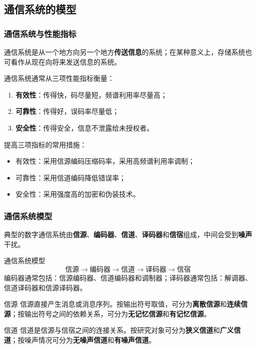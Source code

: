 \subsection{通信系统的模型}

\subsubsection{通信系统与性能指标}
通信系统是从一个地方向另一个地方\textbf{传送信息}的系统；在某种意义上，存储系统也可看作从现在向将来发送信息的系统。

通信系统通常从三项性能指标衡量：
\begin{enumerate}
  \item \textbf{有效性}：传得快，码尽量短，频谱利用率尽量高；
  \item \textbf{可靠性}：传得好，误码率尽量低；
  \item \textbf{安全性}：传得安全，信息不泄露给未授权者。
\end{enumerate}

提高三项指标的常用措施：
\begin{itemize}
  \item 有效性：采用信源编码压缩码率，采用高频谱利用率调制；
  \item 可靠性：采用信道编码降低错误率；
  \item 安全性：采用强度高的加密和伪装技术。
\end{itemize}

\subsubsection{通信系统模型}
典型的数字通信系统由\textbf{信源}、\textbf{编码器}、\textbf{信道}、\textbf{译码器}和\textbf{信宿}组成，中间会受到\textbf{噪声}干扰。

\begin{formulaBox}{通信系统模型}
\[
\text{信源} \to \text{编码器} \to \text{信道} \to \text{译码器} \to \text{信宿}
\]
编码器通常包括：信源编码器、信道编码器和调制器；译码器通常包括：解调器、信道译码器和信源译码器。
\end{formulaBox}

\begin{definitionBox}{信源}
信源直接产生消息或消息序列。按输出符号取值，可分为\textbf{离散信源}和\textbf{连续信源}；按输出符号之间的依赖关系，可分为\textbf{无记忆信源}和\textbf{有记忆信源}。
\end{definitionBox}

\begin{definitionBox}{信道}
信道是信源与信宿之间的连接关系。按研究对象可分为\textbf{狭义信道}和\textbf{广义信道}；按噪声情况可分为\textbf{无噪声信道}和\textbf{有噪声信道}。
\end{definitionBox}

